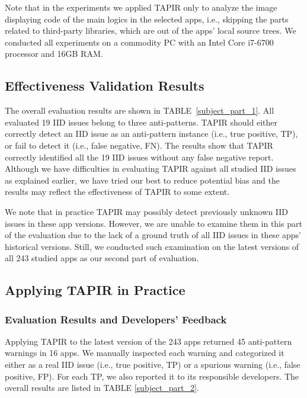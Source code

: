 Note that in the experiments we applied TAPIR only to analyze the image displaying code of the main logics in the selected apps, i.e., skipping the parts related to third-party libraries, which are out of the apps’ local source trees. We conducted all experiments on a commodity PC with an Intel Core i7-6700 processor and 16GB RAM.

\subsection{Effectiveness Validation Results} \label{subsec:eval-result}



The overall evaluation results are shown in TABLE~\ref{subject_part_1}.
All evaluated 19 IID issues belong to three anti-patterns.
TAPIR should either correctly detect an IID issue as an anti-pattern instance (i.e., true positive, TP),
or fail to detect it (i.e., false negative, FN).
The results show that TAPIR correctly identified all the 19 IID issues without any false negative report.
Although we have difficulties in evaluating TAPIR against all studied IID issues as explained earlier,
we have tried our best to reduce potential bias and the results may reflect the effectiveness of TAPIR to some extent.

We note that in practice TAPIR may possibly detect previously unknown IID issues in these app versions. However, we are unable to examine them in this part of the evaluation due to the lack of a ground truth of all IID issues in these apps' historical versions. Still,
we conducted such examination on the latest versions of all 243 studied apps as our second part of evaluation.

\subsection{Applying TAPIR in Practice}  \label{subsec:eval-realworld}

\subsubsection{Evaluation Results and Developers' Feedback}



Applying TAPIR to the latest version of the 243 apps
returned 45 anti-pattern warnings in 16 apps.
We manually inspected each warning and categorized it either as a real IID issue (i.e., true positive, TP) or a spurious warning (i.e., false positive, FP).
For each TP, we also reported it to its responsible developers.
The overall results are listed in TABLE \ref{subject_part_2}.

